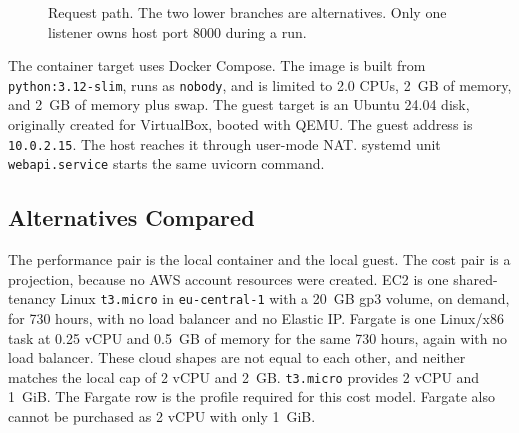 \documentclass[conference,a4paper]{IEEEtran}
\begin{document}
\begin{figure}[htbp]
	\centering
	\caption{Request path. The two lower branches are alternatives. Only one listener owns host port 8000 during a run.}
	\label{fig:architecture}
\end{figure}

The container target uses Docker Compose. The image is built from \texttt{python:3.12-slim}, runs as \texttt{nobody}, and is limited to 2.0 CPUs, 2~GB of memory, and 2~GB of memory plus swap. The guest target is an Ubuntu 24.04 disk, originally created for VirtualBox, booted with QEMU. The guest address is \texttt{10.0.2.15}. The host reaches it through user-mode NAT. systemd unit \texttt{webapi.service} starts the same uvicorn command.

\subsection{Alternatives Compared}

The performance pair is the local container and the local guest. The cost pair is a projection, because no AWS account resources were created. EC2 is one shared-tenancy Linux \texttt{t3.micro} in \texttt{eu-central-1} with a 20~GB gp3 volume, on demand, for 730 hours, with no load balancer and no Elastic IP. Fargate is one Linux/x86 task at 0.25 vCPU and 0.5~GB of memory for the same 730 hours, again with no load balancer. These cloud shapes are not equal to each other, and neither matches the local cap of 2 vCPU and 2~GB. \texttt{t3.micro} provides 2 vCPU and 1~GiB. The Fargate row is the profile required for this cost model. Fargate also cannot be purchased as 2 vCPU with only 1~GiB.
\end{document}
